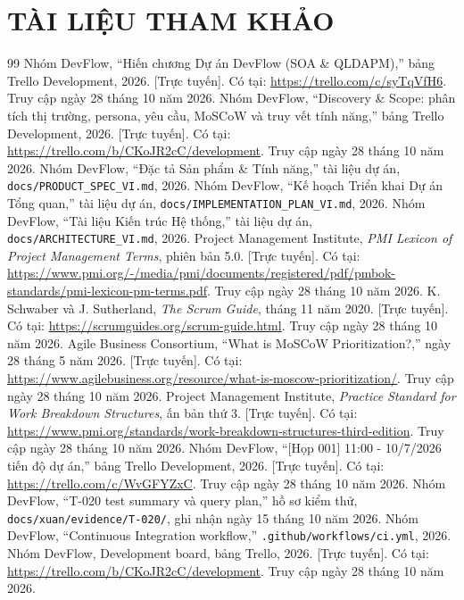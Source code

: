 \documentclass[12pt,a4paper]{report}
\begin{document}
\clearpage
\chapter*{TÀI LIỆU THAM KHẢO}
\begin{thebibliography}{99}
 Nhóm DevFlow, ``Hiến chương Dự án DevFlow (SOA \& QLDAPM),'' bảng Trello Development, 2026. [Trực tuyến]. Có tại: \url{https://trello.com/c/syTqVfH6}. Truy cập ngày 28 tháng 10 năm 2026.
 Nhóm DevFlow, ``Discovery \& Scope: phân tích thị trường, persona, yêu cầu, MoSCoW và truy vết tính năng,'' bảng Trello Development, 2026. [Trực tuyến]. Có tại: \url{https://trello.com/b/CKoJR2cC/development}. Truy cập ngày 28 tháng 10 năm 2026.
 Nhóm DevFlow, ``Đặc tả Sản phẩm \& Tính năng,'' tài liệu dự án, \texttt{docs/PRODUCT\_SPEC\_VI.md}, 2026.
 Nhóm DevFlow, ``Kế hoạch Triển khai Dự án Tổng quan,'' tài liệu dự án, \texttt{docs/IMPLEMENTATION\_PLAN\_VI.md}, 2026.
 Nhóm DevFlow, ``Tài liệu Kiến trúc Hệ thống,'' tài liệu dự án, \texttt{docs/ARCHITECTURE\_VI.md}, 2026.
 Project Management Institute, \emph{PMI Lexicon of Project Management Terms}, phiên bản 5.0. [Trực tuyến]. Có tại: \url{https://www.pmi.org/-/media/pmi/documents/registered/pdf/pmbok-standards/pmi-lexicon-pm-terms.pdf}. Truy cập ngày 28 tháng 10 năm 2026.
 K. Schwaber và J. Sutherland, \emph{The Scrum Guide}, tháng 11 năm 2020. [Trực tuyến]. Có tại: \url{https://scrumguides.org/scrum-guide.html}. Truy cập ngày 28 tháng 10 năm 2026.
 Agile Business Consortium, ``What is MoSCoW Prioritization?,'' ngày 28 tháng 5 năm 2026. [Trực tuyến]. Có tại: \url{https://www.agilebusiness.org/resource/what-is-moscow-prioritization/}. Truy cập ngày 28 tháng 10 năm 2026.
 Project Management Institute, \emph{Practice Standard for Work Breakdown Structures}, ấn bản thứ 3. [Trực tuyến]. Có tại: \url{https://www.pmi.org/standards/work-breakdown-structures-third-edition}. Truy cập ngày 28 tháng 10 năm 2026.
 Nhóm DevFlow, ``[Họp 001] 11:00 - 10/7/2026 tiến độ dự án,'' bảng Trello Development, 2026. [Trực tuyến]. Có tại: \url{https://trello.com/c/WvGFYZxC}. Truy cập ngày 28 tháng 10 năm 2026.
 Nhóm DevFlow, ``T-020 test summary và query plan,'' hồ sơ kiểm thử, \texttt{docs/xuan/evidence/T-020/}, ghi nhận ngày 15 tháng 10 năm 2026.
 Nhóm DevFlow, ``Continuous Integration workflow,'' \texttt{.github/workflows/ci.yml}, 2026.
 Nhóm DevFlow, Development board, bảng Trello, 2026. [Trực tuyến]. Có tại: \url{https://trello.com/b/CKoJR2cC/development}. Truy cập ngày 28 tháng 10 năm 2026.
\end{thebibliography}
\end{document}
